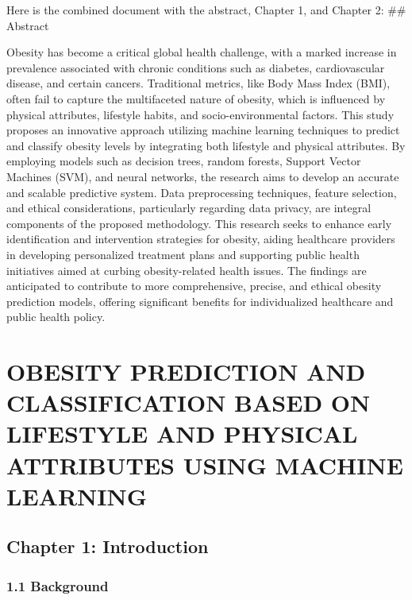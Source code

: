 Here is the combined document with the abstract, Chapter 1, and Chapter
2: \#\# Abstract

Obesity has become a critical global health challenge, with a marked
increase in prevalence associated with chronic conditions such as
diabetes, cardiovascular disease, and certain cancers. Traditional
metrics, like Body Mass Index (BMI), often fail to capture the
multifaceted nature of obesity, which is influenced by physical
attributes, lifestyle habits, and socio-environmental factors. This
study proposes an innovative approach utilizing machine learning
techniques to predict and classify obesity levels by integrating both
lifestyle and physical attributes. By employing models such as decision
trees, random forests, Support Vector Machines (SVM), and neural
networks, the research aims to develop an accurate and scalable
predictive system. Data preprocessing techniques, feature selection, and
ethical considerations, particularly regarding data privacy, are
integral components of the proposed methodology. This research seeks to
enhance early identification and intervention strategies for obesity,
aiding healthcare providers in developing personalized treatment plans
and supporting public health initiatives aimed at curbing
obesity-related health issues. The findings are anticipated to
contribute to more comprehensive, precise, and ethical obesity
prediction models, offering significant benefits for individualized
healthcare and public health policy.

\hypertarget{obesity-prediction-and-classification-based-on-lifestyle-and-physical-attributes-using-machine-learning}{%
\section{OBESITY PREDICTION AND CLASSIFICATION BASED ON LIFESTYLE AND
PHYSICAL ATTRIBUTES USING MACHINE
LEARNING}\label{obesity-prediction-and-classification-based-on-lifestyle-and-physical-attributes-using-machine-learning}}

\hypertarget{chapter-1-introduction}{%
\subsection{Chapter 1: Introduction}\label{chapter-1-introduction}}

\hypertarget{background}{%
\subsubsection{1.1 Background}\label{background}}

